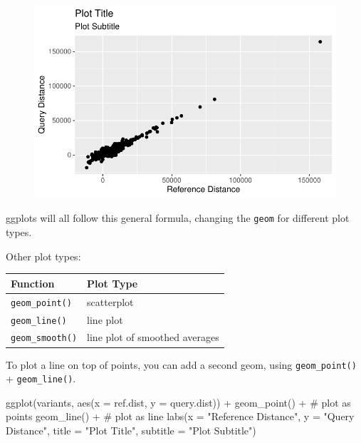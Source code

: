 \documentclass[
  letterpaper,
  DIV=11,
  numbers=noendperiod]{scrreprt}
\newenvironment{Shaded}{\begin{snugshade}}{\end{snugshade}}
\newcommand{\AttributeTok}[1]{\textcolor[rgb]{0.40,0.45,0.13}{#1}}
\newcommand{\CommentTok}[1]{\textcolor[rgb]{0.37,0.37,0.37}{#1}}
\newcommand{\FunctionTok}[1]{\textcolor[rgb]{0.28,0.35,0.67}{#1}}
\newcommand{\NormalTok}[1]{\textcolor[rgb]{0.00,0.23,0.31}{#1}}
\newcommand{\SpecialCharTok}[1]{\textcolor[rgb]{0.37,0.37,0.37}{#1}}
\newcommand{\StringTok}[1]{\textcolor[rgb]{0.13,0.47,0.30}{#1}}
\begin{document}
\begin{figure}[H]

{\centering \includegraphics{scripts/02_dataViz/class3_files/figure-pdf/unnamed-chunk-11-1.pdf}

}

\end{figure}

ggplots will all follow this general formula, changing the \texttt{geom}
for different plot types.

Other plot types:

\begin{longtable}[]{@{}ll@{}}
\toprule()
Function & Plot Type \\
\midrule()
\endhead
\texttt{geom\_point()} & scatterplot \\
\texttt{geom\_line()} & line plot \\
\texttt{geom\_smooth()} & line plot of smoothed averages \\
\bottomrule()
\end{longtable}

To plot a line on top of points, you can add a second geom, using
\texttt{geom\_point()} + \texttt{geom\_line()}.

\begin{Shaded}
\begin{Highlighting}[]
\FunctionTok{ggplot}\NormalTok{(variants, }\FunctionTok{aes}\NormalTok{(}\AttributeTok{x =}\NormalTok{ ref.dist, }\AttributeTok{y =}\NormalTok{ query.dist)) }\SpecialCharTok{+}
  \FunctionTok{geom\_point}\NormalTok{() }\SpecialCharTok{+} \CommentTok{\# plot as points}
  \FunctionTok{geom\_line}\NormalTok{() }\SpecialCharTok{+} \CommentTok{\# plot as line}
  \FunctionTok{labs}\NormalTok{(}\AttributeTok{x =} \StringTok{"Reference Distance"}\NormalTok{,}
       \AttributeTok{y =} \StringTok{"Query Distance"}\NormalTok{,}
       \AttributeTok{title =} \StringTok{"Plot Title"}\NormalTok{,}
       \AttributeTok{subtitle =} \StringTok{"Plot Subtitle"}\NormalTok{)}
\end{Highlighting}
\end{Shaded}
\end{document}

